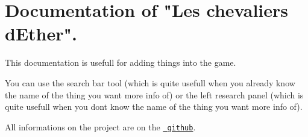\chapter{Documentation of "{}\+Les chevaliers d\textquotesingle{}\+Ether"{}.}
\hypertarget{index}{}\label{index}
This documentation is usefull for adding things into the game.

You can use the search bar tool (which is quite usefull when you already know the name of the thing you want more info of) or the left research panel (which is quite usefull when you don\textquotesingle{}t know the name of the thing you want more info of).

All informations on the project are on the \href{https://github.com/fedyna-k/Projet-POO/}{\texttt{ github}}. 